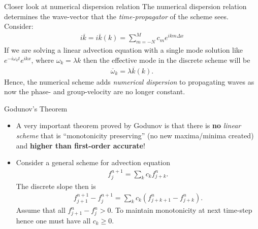 \documentclass[aspectratio=169]{beamer}
\newcommand{\mypause}{\pause}
\begin{document}
\begin{frame}{Closer look at numerical dispersion relation}
  The numerical dispersion relation determines the wave-vector that
  the \emph{time-propagator} of the scheme sees. Consider:
  \begin{align*}
    i\overline{k} = i\overline{k}(k) =  \sum_{m=-N}^{M} c_m e^{i k m \Delta x}
  \end{align*}
  If we are solving a linear advection equation with a single mode
  solution like $e^{-i \omega_k t} e^{i k x}$, where
  $\omega_k = \lambda k$ then the effective mode in the discrete
  scheme will be
  \begin{align*}
    \overline{\omega}_k = \lambda \overline{k}(k).
  \end{align*}
  Hence, the numerical scheme adds \emph{numerical dispersion} to
  propagating waves as now the phase- and group-velocity are no longer
  constant.

\end{frame}  


\begin{frame}{Godunov's Theorem}
  \small%
  \begin{itemize}
  \item A very important theorem proved by Godunov is that there is {
      \bf no} \emph{linear scheme} that is ``monotonicity preserving''
    (no new maxima/minima created) and {\bf higher than first-order
      accurate}!  \mypause%
  \item Consider a general scheme for advection equation
    \begin{align*}
      f_j^{n+1} = \sum_k c_k f_{j+k}^n.
    \end{align*}
    The discrete slope then is
    \begin{align*}
      f_{j+1}^{n+1} - f_j^{n+1} = \sum_k c_k \left( f_{j+k+1}^n - f_{j+k}^n \right).
    \end{align*}
    Assume that all $f_{j+1}^n - f_j^n > 0$. To maintain monotonicity
    at next time-step hence one must have all $c_k \ge 0$.
  \end{itemize}
\end{frame}
\end{document}
